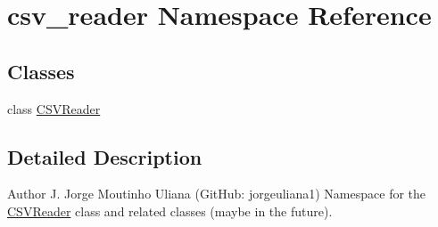\hypertarget{namespacecsv__reader}{}\section{csv\+\_\+reader Namespace Reference}
\label{namespacecsv__reader}
\subsection*{Classes}
\begin{DoxyCompactItemize}
\item 
class \hyperlink{classcsv__reader_1_1CSVReader}{C\+S\+V\+Reader}
\end{DoxyCompactItemize}


\subsection{Detailed Description}
\begin{DoxyAuthor}{Author}
J. Jorge Moutinho Uliana (Git\+Hub\+: jorgeuliana1) Namespace for the \hyperlink{classcsv__reader_1_1CSVReader}{C\+S\+V\+Reader} class and related classes (maybe in the future). 
\end{DoxyAuthor}
